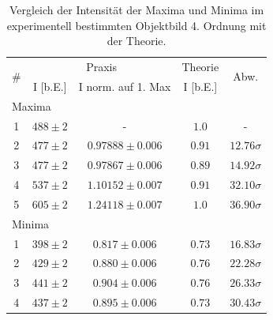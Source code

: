 \begin{table}[H]
  \centering
  \caption{Vergleich der Intensität der Maxima und Minima im experimentell bestimmten Objektbild 4. Ordnung mit der Theorie.}
  \vspace*{0.5em}
  \begin{tabular}{|c|c|c|c|c|}\hline
    \multirow{2}{*}{\#} & \multicolumn{2}{c|}{Praxis} & \multicolumn{1}{c|}{Theorie} & \multirow{2}{*}{Abw.}\\\cline{2-4}
        & I [b.E.] & I norm. auf 1. Max & I [b.E.] & \\\hline
    \multicolumn{5}{|l|}{Maxima}\\\hline
    1 & $488 \pm 2$ & - & $1.0$ & - \\
    2 & $477 \pm 2$ & $0.97888 \pm 0.006$ & $0.91$ &  $12.76\sigma$ \\
    3 & $477 \pm 2$ & $0.97867 \pm 0.006$ & $0.89$ &  $14.92\sigma$ \\
    4 & $537 \pm 2$ & $1.10152 \pm 0.007$ & $0.91$ &  $32.10\sigma$ \\
    5 & $605 \pm 2$ & $1.24118 \pm 0.007$ & $1.0$ &  $36.90\sigma$ \\\hline
    \multicolumn{5}{|l|}{Minima}\\\hline
    1 & $398 \pm 2$ & $0.817 \pm 0.006$ & $0.73$ & $16.83\sigma$ \\
    2 & $429 \pm 2$ & $0.880 \pm 0.006$ & $0.76$ & $22.28\sigma$ \\
    3 & $441 \pm 2$ & $0.904 \pm 0.006$ & $0.76$ & $26.33\sigma$ \\
    4 & $437 \pm 2$ & $0.895 \pm 0.006$ & $0.73$ & $30.43\sigma$ \\\hline
  \end{tabular}
  \label{tab:vergl_objbild_ma_mi_i_ord4}
\end{table}


